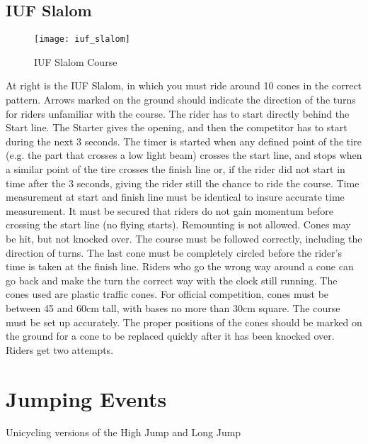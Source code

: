 \subsection{IUF Slalom}
\begin{figure}[h]
\begin{center}
\texttt{[image: iuf\_slalom]}
\end{center}
\vspace{-20pt}
\caption{IUF Slalom Course \label{fig:iuf_slalom}}
\vspace{-10pt}
\end{figure}
At right is the IUF Slalom, in which you must ride around 10 cones in the correct pattern.
Arrows marked on the ground should indicate the direction of the turns for riders unfamiliar with the course.
The rider has to start directly behind the Start line.
The Starter gives the opening, and then the competitor has to start during the next 3 seconds.
The timer is started when any defined point of the tire (e.g. the part that crosses a low light beam) crosses the start line, and stops when a similar point of the tire crosses the finish line or, if the rider did not start in time after the 3 seconds, giving the rider still the chance to ride the course.
Time measurement at start and finish line must be identical to insure accurate time measurement.
It must be secured that riders do not gain momentum before crossing the start line (no flying starts).
Remounting is not allowed. 
Cones may be hit, but not knocked over.
The course must be followed correctly, including the direction of turns.
The last cone must be completely circled before the rider's time is taken at the finish line.
Riders who go the wrong way around a cone can go back and make the turn the correct way with the clock still running.
The cones used are plastic traffic cones.
For official competition, cones must be between 45 and 60cm tall, with bases no more than 30cm square.
The course must be set up accurately.
The proper positions of the cones should be marked on the ground for a cone to be replaced quickly after it has been knocked over.
Riders get two attempts.

\section{Jumping Events \label{sec:track-field_jumping-events}}
Unicycling versions of the High Jump and Long Jump 
